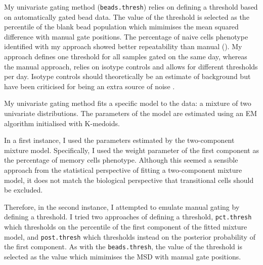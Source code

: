 My  univariate gating method (\texttt{beads.thresh}) relies on defining a threshold based on automatically gated bead data.
The value of the threshold is selected as the percentile of the blank bead population which mimimises the mean squared difference with manual gate positions.
The percentage of naive \positive cells phenotype identified with my approach showed better repeatability than manual ().
My approach defines one threshold for all samples gated on the same day,
whereas the manual approach, relies on isotype controls and allows for different thresholds per day.
Isotype controls should theoretically be an estimate of background but have been criticised for being an extra source of noise \citep{OGorman:1999vd,Maecker:2006ft}.

My  univariate gating method fits a specific model to the data: a mixture of two univariate distributions.
The parameters of the model are estimated using an \Gls{EM} algorithm \citep{Dempster:1977ul} initialised with K-medoids.

In a first instance, I used the parameters estimated by the two-component mixture model.
Specifically, I used the weight parameter of the first component as the percentage of memory cells phenotype.
Although this seemed a sensible approach from the statistical perspective of fitting a two-component mixture model, it does not match the biological perspective that transitional
cells should be excluded.

Therefore, in the second instance, I attempted to emulate manual gating by defining a threshold.
I tried two approaches of defining a threshold, \texttt{pct.thresh} which thresholds on the percentile of the first component of the fitted mixture model,
and \texttt{post.thresh} which thresholds instead on the posterior probability of the first component.
As with the \texttt{beads.thresh}, the value of the threshold is selected as the value which mimimises the \gls{MSD} with manual gate positions.


